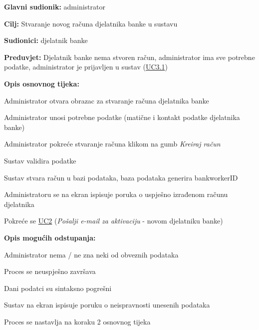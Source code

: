 					\begin{packed_item}
	
						\item \textbf{Glavni sudionik: }administrator
						\item  \textbf{Cilj:} Stvaranje novog računa djelatnika banke u sustavu
						\item  \textbf{Sudionici:} djelatnik banke
						\item  \textbf{Preduvjet:} Djelatnik banke nema stvoren račun, administrator ima sve potrebne podatke, administrator je prijavljen u sustav (\hyperref[UC3.1]{UC3.1})
						\item  \textbf{Opis osnovnog tijeka:}
						
						\item[] \begin{packed_enum}
                        	\item Administrator otvara obrazac za stvaranje računa djelatnika banke
							\item Administrator unosi potrebne podatke (matične i kontakt podatke djelatnika banke)
							\item Administrator pokreće stvaranje računa klikom na gumb \textit{Kreiraj račun}
							\item Sustav validira podatke 
							\item Sustav stvara račun u bazi podataka, baza podataka generira bankworkerID
							\item Administratoru se na ekran ispisuje poruka o uspješno izrađenom računu djelatnika
							\item Pokreće se \hyperref[UC2]{UC2} (\textit{Pošalji e-mail za aktivaciju} - novom djelatniku banke)
						\end{packed_enum}
						
						\item  \textbf{Opis mogućih odstupanja:}
						
						\item[] \begin{packed_item}
	
                        	\item[2.a] Administrator nema / ne zna neki od obveznih podataka
							\begin{packed_enum}
								\item Proces se neuspješno završava
							\end{packed_enum}
						
							\item[4.a] Dani podatci su sintaksno pogrešni
							\begin{packed_enum}
								\item Sustav na ekran ispisuje poruku o neispravnosti unesenih podataka
								\item Proces se nastavlja na koraku 2 osnovnog tijeka
							\end{packed_enum}
							

\end{packed_item}
\end{packed_item}
